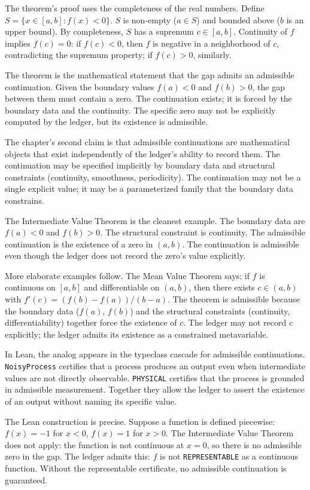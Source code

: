 The theorem's proof uses the completeness of the real numbers. Define
$S = \{x \in [a, b] : f(x) < 0\}$. $S$ is non-empty ($a \in S$) and
bounded above ($b$ is an upper bound). By completeness, $S$ has a
supremum $c \in [a, b]$. Continuity of $f$ implies $f(c) = 0$: if
$f(c) < 0$, then $f$ is negative in a neighborhood of $c$, contradicting
the supremum property; if $f(c) > 0$, similarly.

The theorem is the mathematical statement that the gap admits an
admissible continuation. Given the boundary values $f(a) < 0$ and
$f(b) > 0$, the gap between them must contain a zero. The continuation
exists; it is forced by the boundary data and the continuity. The
specific zero may not be explicitly computed by the ledger, but its
existence is admissible.

The chapter's second claim is that admissible continuations are
mathematical objects that exist independently of the ledger's
ability to record them. The continuation may be specified
implicitly by boundary data and structural constraints (continuity,
smoothness, periodicity). The continuation may not be a single
explicit value; it may be a parameterized family that the boundary
data constrains.

The Intermediate Value Theorem is the cleanest example. The
boundary data are $f(a) < 0$ and $f(b) > 0$. The structural
constraint is continuity. The admissible continuation is the
existence of a zero in $(a, b)$. The continuation is admissible
even though the ledger does not record the zero's value
explicitly.

More elaborate examples follow. The Mean Value Theorem says: if
$f$ is continuous on $[a, b]$ and differentiable on $(a, b)$, then
there exists $c \in (a, b)$ with $f'(c) = (f(b) - f(a))/(b - a)$.
The theorem is admissible because the boundary data ($f(a)$,
$f(b)$) and the structural constraints (continuity,
differentiability) together force the existence of $c$. The
ledger may not record $c$ explicitly; the ledger admits its
existence as a constrained metavariable.

In Lean, the analog appears in the typeclass cascade for
admissible continuations. \texttt{NoisyProcess} certifies that a
process produces an output even when intermediate values are not
directly observable. \texttt{PHYSICAL} certifies that the
process is grounded in admissible measurement. Together they
allow the ledger to assert the existence of an output without
naming its specific value.

The Lean construction is precise. Suppose a function is defined
piecewise: $f(x) = -1$ for $x < 0$, $f(x) = 1$ for $x > 0$. The
Intermediate Value Theorem does not apply: the function is not
continuous at $x = 0$, so there is no admissible zero in the
gap. The ledger admits this: $f$ is not \texttt{REPRESENTABLE} as
a continuous function. Without the representable certificate, no
admissible continuation is guaranteed.

